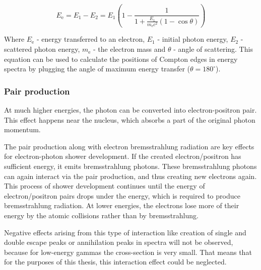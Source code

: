 \begin{equation}
E_{\textrm{e}} = E_1 - E_2 = E_1 (1- \frac{1}{1+\frac{E_1}{m_{\textrm{e}}c^2}(1 - \cos{\theta})})
\end{equation}


\par
Where $E_{\textrm{e}}$ - energy transferred to an electron, $E_1$ - initial photon energy, $E_2$ - scattered photon energy, $m_{\textrm{e}}$ - the electron mass and $\theta$ - angle of scattering. This equation can be used to calculate the positions of Compton edges in energy spectra by plugging the angle of maximum energy transfer ($\theta = 180^\circ$).


\subsubsection{Pair production}
At much higher energies, the photon can be converted into electron-positron pair. This effect happens near the nucleus, which absorbs a part of the original photon momentum.
\par
The pair production along with electron bremsstrahlung radiation  are key effects for electron-photon shower development. If the created electron/positron has sufficient energy, it emits bremsstrahlung photons. These bremsstrahlung photons can again interact via the pair production, and thus creating new electrons again. This process of shower development continues until the energy of electron/positron pairs drops under the energy, which is required to produce bremsstrahlung radiation. At lower energies, the electrons lose more of their energy by the atomic collisions rather than by bremsstrahlung.
\par
Negative effects arising from this type of interaction like creation of single and double escape peaks or annihilation peaks in spectra will not be observed, because for low-energy gammas the cross-section is very small. That means that for the purposes of this thesis, this interaction effect could be neglected.   


